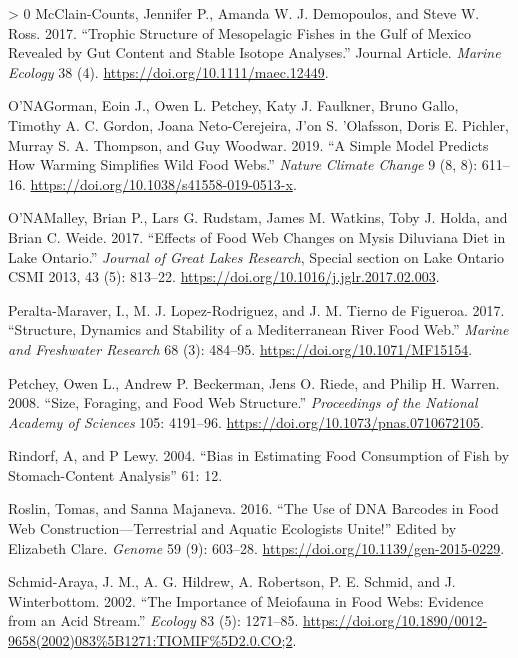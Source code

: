 \documentclass{article}
\newlength{\cslhangindent}
\newenvironment{CSLReferences}[3] %
 {%
  \setlength{\parindent}{0pt}
  \ifodd #1 \everypar{\setlength{\hangindent}{\cslhangindent}}\ignorespaces\fi
  \ifnum #2 > 0
  \setlength{\parskip}{#2\baselineskip}
  \fi
 }%
 {}
\begin{document}
\begin{CSLReferences}{1}{0}
\leavevmode\hypertarget{ref-mcclain-countsTrophicStructureMesopelagic2017b}{}%
McClain-Counts, Jennifer P., Amanda W. J. Demopoulos, and Steve W. Ross.
2017. {``Trophic Structure of Mesopelagic Fishes in the {Gulf} of
{Mexico} Revealed by Gut Content and Stable Isotope Analyses.''} Journal
Article. \emph{Marine Ecology} 38 (4).
\url{https://doi.org/10.1111/maec.12449}.

\leavevmode\hypertarget{ref-ogormanSimpleModelPredicts2019}{}%
O'NAGorman, Eoin J., Owen L. Petchey, Katy J. Faulkner, Bruno Gallo,
Timothy A. C. Gordon, Joana Neto-Cerejeira, J'on S. 'Olafsson, Doris E.
Pichler, Murray S. A. Thompson, and Guy Woodwar. 2019. {``A Simple Model
Predicts How Warming Simplifies Wild Food Webs.''} \emph{Nature Climate
Change} 9 (8, 8): 611--16.
\url{https://doi.org/10.1038/s41558-019-0513-x}.

\leavevmode\hypertarget{ref-omalleyEffectsFoodWeb2017}{}%
O'NAMalley, Brian P., Lars G. Rudstam, James M. Watkins, Toby J. Holda,
and Brian C. Weide. 2017. {``Effects of Food Web Changes on {Mysis}
Diluviana Diet in {Lake Ontario}.''} \emph{Journal of Great Lakes
Research}, Special {section} on {Lake Ontario CSMI} 2013, 43 (5):
813--22. \url{https://doi.org/10.1016/j.jglr.2017.02.003}.

\leavevmode\hypertarget{ref-peralta-maraverStructureDynamicsStability2017}{}%
Peralta-Maraver, I., M. J. Lopez-Rodriguez, and J. M. Tierno de
Figueroa. 2017. {``Structure, Dynamics and Stability of a
{Mediterranean} River Food Web.''} \emph{Marine and Freshwater Research}
68 (3): 484--95. \url{https://doi.org/10.1071/MF15154}.

\leavevmode\hypertarget{ref-petcheySizeForagingFood2008}{}%
Petchey, Owen L., Andrew P. Beckerman, Jens O. Riede, and Philip H.
Warren. 2008. {``Size, Foraging, and Food Web Structure.''}
\emph{Proceedings of the National Academy of Sciences} 105: 4191--96.
\url{https://doi.org/10.1073/pnas.0710672105}.

\leavevmode\hypertarget{ref-rindorfBiasEstimatingFood2004}{}%
Rindorf, A, and P Lewy. 2004. {``Bias in Estimating Food Consumption of
Fish by Stomach-Content Analysis''} 61: 12.

\leavevmode\hypertarget{ref-roslinUseDNABarcodes2016}{}%
Roslin, Tomas, and Sanna Majaneva. 2016. {``The Use of {DNA} Barcodes in
Food Web Construction---Terrestrial and Aquatic Ecologists Unite!''}
Edited by Elizabeth Clare. \emph{Genome} 59 (9): 603--28.
\url{https://doi.org/10.1139/gen-2015-0229}.

\leavevmode\hypertarget{ref-schmid-arayaImportanceMeiofaunaFood2002}{}%
Schmid-Araya, J. M., A. G. Hildrew, A. Robertson, P. E. Schmid, and J.
Winterbottom. 2002. {``The {Importance} of {Meiofauna} in {Food Webs}:
{Evidence} from an {Acid Stream}.''} \emph{Ecology} 83 (5): 1271--85.
\url{https://doi.org/10.1890/0012-9658(2002)083\%5B1271:TIOMIF\%5D2.0.CO;2}.


\end{CSLReferences}
\end{document}
